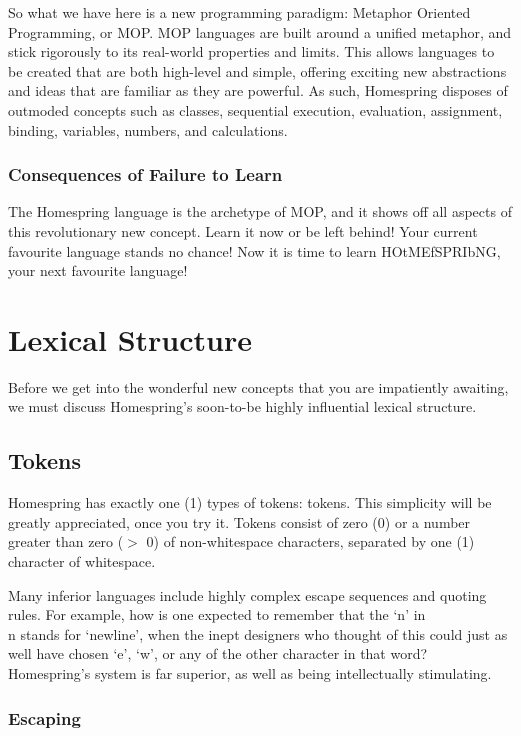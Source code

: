 \documentclass[10pt]{article}
\begin{document}
So what we have here is a new programming paradigm: Metaphor Oriented Programming, or MOP. MOP languages are built around a unified metaphor, and stick rigorously to its real-world properties and limits. This allows languages to be created that are both high-level and simple, offering exciting new abstractions and ideas that are familiar as they are powerful. As such, Homespring disposes of outmoded concepts such as classes, sequential execution, evaluation, assignment, binding, variables, numbers, and calculations.

\subsubsection{Consequences of Failure to Learn}

The Homespring language is the archetype of MOP, and it shows off all aspects of this revolutionary new concept. Learn it now or be left behind! Your current favourite language stands no chance! Now it is time to learn HOtMEfSPRIbNG, your next favourite language!

\section{Lexical Structure}

Before we get into the wonderful new concepts that you are impatiently awaiting, we must discuss Homespring's soon-to-be highly influential lexical structure.

\subsection{Tokens}

Homespring has exactly one (1) types of tokens: tokens. This simplicity will be greatly appreciated, once you try it. Tokens consist of zero (0) or a number greater than zero ($>$ 0) of non-whitespace characters, separated by one (1) character of whitespace.

Many inferior languages include highly complex escape sequences and quoting rules. For example, how is one expected to remember that the `n' in \\n stands for `newline', when the inept designers who thought of this could just as well have chosen `e', `w', or any of the other character in that word? Homespring's system is far superior, as well as being intellectually stimulating.

\subsubsection{Escaping}
\end{document}
